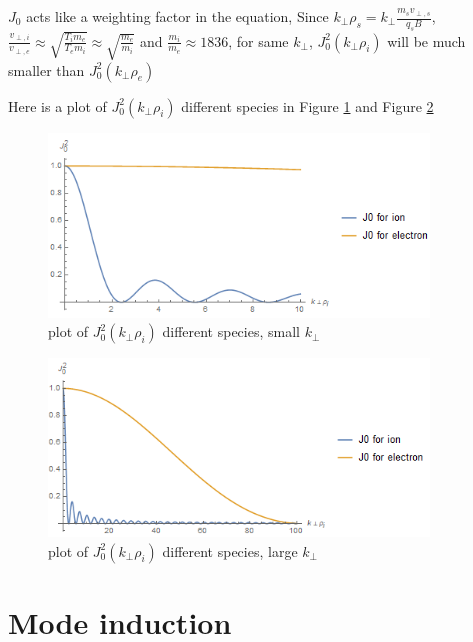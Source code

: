 $J_0$ acts like a weighting factor in the equation, Since $k_\perp\rho_s=k_\perp\frac{m_sv_{\perp,s}}{q_s B}$, $\frac{v_{\perp,i}}{v_{\perp,e}}\approx \sqrt{\frac{T_im_e}{T_em_i}}\approx \sqrt{\frac{m_e}{m_i}}$ and $\frac{m_i}{m_e}\approx 1836$, for same $k_\perp$, $J_0^2(k_{\perp} \rho_i)$ will be much smaller than $J_0^2(k_\perp \rho_e)$

Here is a plot of $J_0^2(k_\perp\rho_i)$ different species in Figure \ref{fig:J0_1} and Figure \ref{fig:J0_2}

\begin{figure}[h] \centering
        \includegraphics[width=0.9\textwidth]{Image/J0_1.PNG}
        \caption{plot of $J_0^2(k_\perp\rho_i)$ different species, small $k_\perp$}
        \label{fig:J0_1}
\end{figure}

\begin{figure}[h] \centering
        \includegraphics[width=0.9\textwidth]{Image/J0_2.PNG}
        \caption{plot of $J_0^2(k_\perp\rho_i)$ different species, large $k_\perp$}
        \label{fig:J0_2}
\end{figure}








\section{Mode induction}

